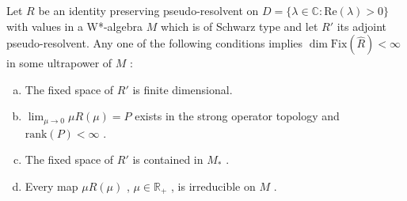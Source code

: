 \begin{theorem}\label{thm:d4-4.4}
Let $ R $  be an identity preserving pseudo-resolvent on $ D = \{\lambda \in \mathbb{C}: \text{Re}(\lambda) > 0\} $  with values in a W*-algebra $ M $  which is of Schwarz type and let $ R' $  its adjoint pseudo-resolvent.
Any one of the following conditions implies $ \dim \text{Fix}(\hat{R}) < \infty $  in some ultrapower of $ M $ :

\begin{enumerate}[(a)]
\item
The fixed space of $ R' $  is finite dimensional.

\item
$ \lim_{\mu \to 0} \mu R(\mu) = P $  exists in the strong operator topology and $ \text{rank}(P) < \infty $ .

\item
The fixed space of $ R' $  is contained in $ M_{*} $ .

\item
Every map $ \mu R(\mu) $ , $ \mu \in \mathbb{R}_{+} $ , is irreducible on $ M $ .
\end{enumerate}
\end{theorem}

